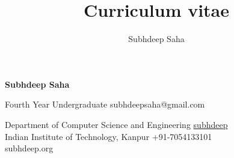 \documentclass[9pt]{extarticle}
\title{Curriculum vitae}
\author{Subhdeep Saha}
\begin{document}
{\Huge\textbf{\sc Subhdeep Saha}}
\hfill


Fourth Year Undergraduate
\hfill
subhdeepsaha@gmail.com \faEnvelope

Department of Computer Science and Engineering
\hfill
\href{https://github.com/subhdeep}{subhdeep \faGithub}\\

Indian Institute of Technology, Kanpur
\hfill
+91-7054133101 \faMobile \\
\hfill
subhdeep.org \faHome

\begin{minipage}[t]{0.49\textwidth}
  \vspace{2mm}
  
  
\end{minipage}
\hfill
\begin{minipage}[t]{0.49\textwidth}
  \vspace{2mm}
  
  \vspace{-4mm}
  
  
  \vspace{-2mm}
  
\end{minipage}
\end{document}
